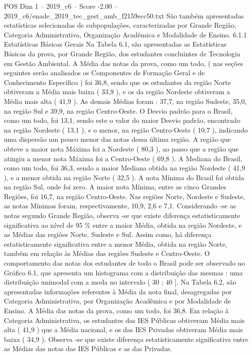 \begin{textsample}{POS Dim 1 – 2019\_c6 – Score -2.00 – 2019\_c6/enade\_2019\_tec\_gest\_amb\_f2159ecc50.txt}
São também apresentadas estatísticas selecionadas de subpopulações, caracterizadas por Grande Região, Categoria Administrativa, Organização Acadêmica e Modalidade de Ensino. 6.1.1 Estatísticas Básicas Gerais Na Tabela 6.1, são apresentadas as Estatísticas Básicas da prova, por Grande Região, dos estudantes concluintes de Tecnologia em Gestão Ambiental.
A Média das notas da prova, como um todo, ( nas seções seguintes serão analisados os Componentes de Formação Geral e de Conhecimento Específico ) foi 36,8, sendo que os estudantes da região Norte obtiveram a Média mais baixa ( 33,9 ), e os da região Nordeste obtiveram a Média mais alta ( 41,9 ).
As demais Médias foram : 37,7, na região Sudeste, 35,0, na região Sul e 39,9, na região Centro-Oeste.
O Desvio padrão para o Brasil, como um todo, foi 13,1, sendo este o valor do maior Desvio padrão, encontrado na região Nordeste ( 13,1 ), e o menor, na região Centro-Oeste ( 10,7 ), indicando uma dispersão um pouco menor das notas dessa última região.
A região que obteve a maior nota Máxima foi a Nordeste ( 80,3 ), ao passo que a região que atingiu a menor nota Máxima foi a Centro-Oeste ( 69,8 ).
A Mediana do Brasil, como um todo, foi 36,3, sendo a maior Mediana obtida na região Nordeste ( 41,9 ), e a menor obtida na região Norte ( 32,5 ).
A nota Mínima do Brasil foi obtida na região Sul, onde foi zero.
A maior nota Mínima, entre as cinco Grandes Regiões, foi 16,7, na região Centro-Oeste.
Nas regiões Norte, Nordeste e Sudeste, as notas Mínimas foram, respectivamente, 10,9, 2,6 e 7,1.
Considerando -se as notas segundo Grande Região, observa -se que existe diferença estatisticamente significativa ao nível de 95 \% entre a maior Média, obtida na região Nordeste, e as Médias das regiões Norte, Sudeste e Sul.
Assim como, há diferença estatisticamente significativa entre a menor Média, obtida na região Norte, também em relação às Médias das regiões Sudeste e Centro-Oeste.
O comportamento das notas dos estudantes de todo o Brasil pode ser observado no Gráfico 6.1, que apresenta um histograma com a distribuição das mesmas : uma distribuição unimodal com a moda no intervalo ( 30 ; 40 ].
Na Tabela 6.2, são apresentadas informações referentes à Média da nota final, desagregadas por Categoria Administrativa, por Organização Acadêmica e por Modalidade de Ensino.
A Média das notas da prova, como um todo, foi 36,8.
Em relação à Categoria Administrativa, os estudantes das IES Públicas obtiveram Média mais alta ( 41,9 ) que a Média nacional, e os das IES Privadas obtiveram Média mais baixa ( 34,9 ).
Observa -se que existe diferença estatisticamente significativa entre as Médias das notas das IES Públicas e as das Privadas.

\end{textsample}

